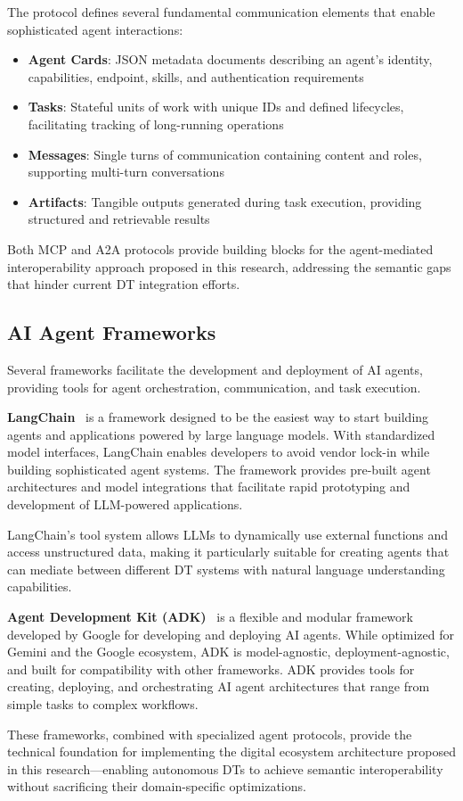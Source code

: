 The protocol defines several fundamental communication elements that enable sophisticated agent interactions:
\begin{itemize}
    \item \textbf{Agent Cards}: JSON metadata documents describing an agent's identity, capabilities, endpoint, skills, and authentication requirements
    \item \textbf{Tasks}: Stateful units of work with unique IDs and defined lifecycles, facilitating tracking of long-running operations
    \item \textbf{Messages}: Single turns of communication containing content and roles, supporting multi-turn conversations
    \item \textbf{Artifacts}: Tangible outputs generated during task execution, providing structured and retrievable results
\end{itemize}

Both MCP and A2A protocols provide building blocks for the agent-mediated interoperability approach proposed in this research,
    addressing the semantic gaps that hinder current DT integration efforts.

\subsection{AI Agent Frameworks}

Several frameworks facilitate the development and deployment of AI agents, providing tools for agent orchestration, communication, and task execution.

\textbf{LangChain}~\cite{LangChainOverview}
    is a framework designed to be the easiest way to start building agents and applications powered by large language models.
With standardized model interfaces, LangChain enables developers to
    avoid vendor lock-in while building sophisticated agent systems.
The framework provides pre-built agent architectures and model integrations that facilitate
    rapid prototyping and development of LLM-powered applications.

LangChain's tool system allows LLMs to dynamically use external functions and access unstructured data,
    making it particularly suitable for creating agents that can mediate between different DT systems with natural language understanding capabilities.

\textbf{Agent Development Kit (ADK)}~\cite{googleAgentDevelopmentKit}
    is a flexible and modular framework developed by Google for developing and deploying AI agents.
While optimized for Gemini and the Google ecosystem, ADK is model-agnostic, deployment-agnostic, and
    built for compatibility with other frameworks.
ADK provides tools for creating, deploying, and orchestrating AI agent architectures that range from simple tasks to complex workflows.

These frameworks, combined with specialized agent protocols, provide the
    technical foundation for implementing the digital ecosystem architecture proposed in this research—enabling
    autonomous DTs to achieve semantic interoperability without sacrificing their domain-specific optimizations.
